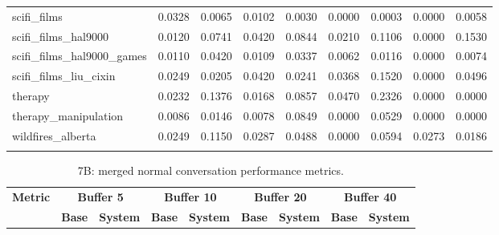 \begin{landscape}
\begin{longtable}{@{}p{3.8cm}cccccccc@{}}
scifi\_films & 0.0328 & 0.0065 & 0.0102 & 0.0030 & 0.0000 & 0.0003 & 0.0000 & 0.0058 \\
scifi\_films\_hal9000 & 0.0120 & 0.0741 & 0.0420 & 0.0844 & 0.0210 & 0.1106 & 0.0000 & 0.1530 \\
scifi\_films\_hal9000\_games & 0.0110 & 0.0420 & 0.0109 & 0.0337 & 0.0062 & 0.0116 & 0.0000 & 0.0074 \\
scifi\_films\_liu\_cixin & 0.0249 & 0.0205 & 0.0420 & 0.0241 & 0.0368 & 0.1520 & 0.0000 & 0.0496 \\
therapy & 0.0232 & 0.1376 & 0.0168 & 0.0857 & 0.0470 & 0.2326 & 0.0000 & 0.0000 \\
therapy\_manipulation & 0.0086 & 0.0146 & 0.0078 & 0.0849 & 0.0000 & 0.0529 & 0.0000 & 0.0000 \\
wildfires\_alberta & 0.0249 & 0.1150 & 0.0287 & 0.0488 & 0.0000 & 0.0594 & 0.0273 & 0.0186 \\
\botrule
\end{longtable}
\begin{longtable}{@{}p{3.8cm}cccccccc@{}}
\caption{7B: merged normal conversation performance metrics.}\label{tab:app_7b_perf_normal}\\

\toprule
\textbf{Metric} & \multicolumn{2}{c}{\textbf{Buffer 5}} & \multicolumn{2}{c}{\textbf{Buffer 10}} & \multicolumn{2}{c}{\textbf{Buffer 20}} & \multicolumn{2}{c}{\textbf{Buffer 40}} \\
\cmidrule(lr){2-3}\cmidrule(lr){4-5}\cmidrule(lr){6-7}\cmidrule(lr){8-9}
 & \textbf{Base} & \textbf{System} & \textbf{Base} & \textbf{System} & \textbf{Base} & \textbf{System} & \textbf{Base} & \textbf{System} \\
\midrule
\endfirsthead


\end{longtable}
\end{landscape}
